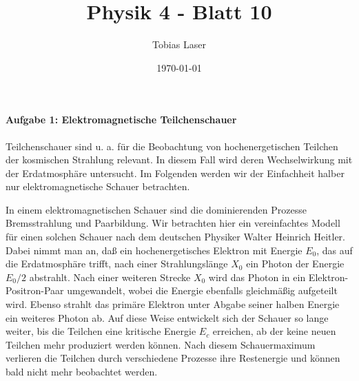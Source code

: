 \documentclass[11pt,a4paper]{scrartcl}
\begin{document}
    \title{Physik 4 - Blatt 10}
    \author{Tobias Laser}
    \date{\today}
    \maketitle
    \vfill
    \thispagestyle{empty}
    \newpage


    \paragraph{Aufgabe 1: Elektromagnetische Teilchenschauer}

    Teilchenschauer sind u. a. für die Beobachtung von hochenergetischen Teilchen der
    kosmischen Strahlung relevant. In diesem Fall wird deren Wechselwirkung mit der
    Erdatmosphäre untersucht. Im Folgenden werden wir der Einfachheit halber nur
    elektromagnetische Schauer betrachten.

    In einem elektromagnetischen Schauer sind die dominierenden Prozesse Bremsstrahlung
    und Paarbildung. Wir betrachten hier ein vereinfachtes Modell für einen solchen
    Schauer nach dem deutschen Physiker Walter Heinrich Heitler. Dabei nimmt man an,
    daß ein hochenergetisches Elektron mit Energie $E_0$, das auf die Erdatmosphäre
    trifft, nach einer Strahlungslänge $X_0$ ein Photon der Energie $E_0/2$ abstrahlt.
    Nach einer weiteren Strecke $X_0$ wird das Photon in ein Elektron-Positron-Paar
    umgewandelt, wobei die Energie ebenfalls gleichmäßig aufgeteilt wird. Ebenso strahlt
    das primäre Elektron unter Abgabe seiner halben Energie ein weiteres Photon ab.
    Auf diese Weise entwickelt sich der Schauer so lange weiter, bis die Teilchen eine
    kritische Energie $E_c$ erreichen, ab der keine neuen Teilchen mehr produziert werden
    können. Nach diesem Schauermaximum verlieren die Teilchen durch verschiedene Prozesse
    ihre Restenergie und können bald nicht mehr beobachtet werden.
\end{document}
